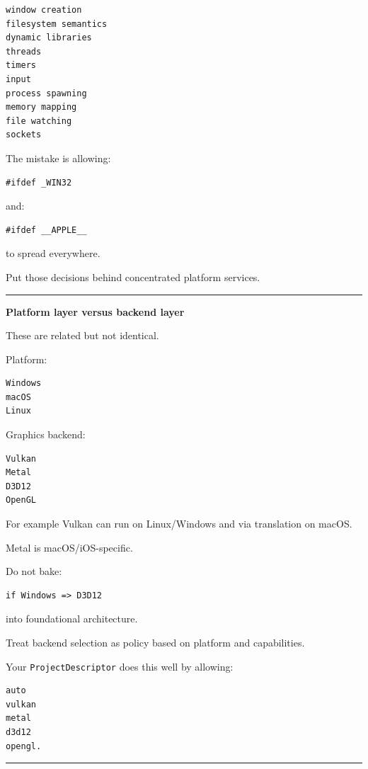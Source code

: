 \begin{verbatim}
window creation
filesystem semantics
dynamic libraries
threads
timers
input
process spawning
memory mapping
file watching
sockets
\end{verbatim}

The mistake is allowing:

\begin{verbatim}
#ifdef _WIN32
\end{verbatim}

and:

\begin{verbatim}
#ifdef __APPLE__
\end{verbatim}

to spread everywhere.

Put those decisions behind concentrated platform services.

\begin{center}\rule{0.5\linewidth}{0.5pt}\end{center}

\textbf{Platform layer versus backend layer}

These are related but not identical.

Platform:

\begin{verbatim}
Windows
macOS
Linux
\end{verbatim}

Graphics backend:

\begin{verbatim}
Vulkan
Metal
D3D12
OpenGL
\end{verbatim}

For example Vulkan can run on Linux/Windows and via translation on macOS.

Metal is macOS/iOS-specific.

Do not bake:

\begin{verbatim}
if Windows => D3D12
\end{verbatim}

into foundational architecture.

Treat backend selection as policy based on platform and capabilities.

Your \texttt{ProjectDescriptor} does this well by allowing:

\begin{verbatim}
auto
vulkan
metal
d3d12
opengl.
\end{verbatim}

\begin{center}\rule{0.5\linewidth}{0.5pt}\end{center}

